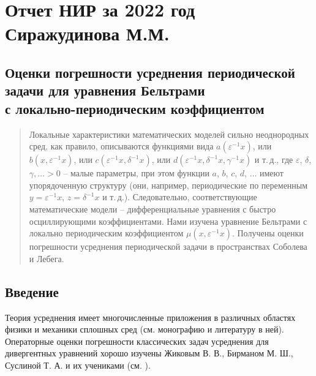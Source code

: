 
  \chapter{Отчет НИР за 2022 год Сиражудинова М.М.}

\section{Оценки погрешности усреднения периодической \\ задачи  для уравнения Бельтрами\\
	с локально-периодическим коэффициентом}
\begin{abstract}
Локальные характеристики математических моделей сильно неоднородных сред, как правило, описываются функциями вида $a(\varepsilon^{-1} x)$, или $b(x,\varepsilon^{-1} x)$, или $c(\varepsilon^{-1} x,\delta^{-1} x)$, \linebreak или $d(\varepsilon^{-1} x,\delta^{-1} x,\gamma^{-1} x)$ и т.\,д., где $\varepsilon$, $\delta$,$\gamma,\ldots>0$ – малые параметры, при этом функции $a$, $b$, $c$, $d$, $\ldots$ имеют упорядоченную структуру (они, например, периодические по переменным $y=\varepsilon^{-1} x$, $z=\delta^{-1} x$  и т.\,д.). Следовательно, соответствующие математические модели – дифференциальные уравнения с быстро осциллирующими коэффициентами.
Нами изучена уравнение Бельтрами с локально периодическим коэффициентом $\mu(x,\varepsilon^{-1} x)$. Получены оценки
погрешности усреднения периодической задачи в пространствах Соболева и Лебега.
\end{abstract}



\section*{Введение}
        \bigskip

Теория усреднения имеет многочисленные приложения в различных областях физики и механики сплошных сред (см. монографию \cite{smm-1} и литературу в  ней). Операторные оценки погрешности классических задач усреднения для дивергентных уравнений хорошо изучены Жиковым В. В., Бирманом   М. Ш., Суслиной  Т. А. и их учениками (см. \cite{smm-2,smm-3}).

